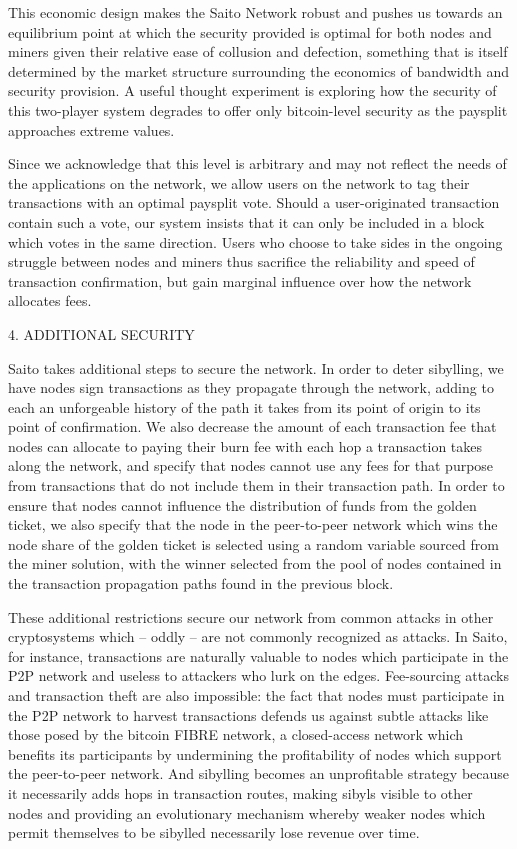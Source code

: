 \documentclass[12pt, oneside]{article}   	%
\begin{document}
\begin{multicols}{2}
This economic design makes the Saito Network robust and pushes us towards an equilibrium point at which the security provided is optimal for both nodes and miners given their relative ease of collusion and defection, something that is itself determined by the market structure surrounding the economics of bandwidth and security provision. A useful thought experiment is exploring how the security of this two-player system degrades to offer only bitcoin-level security as the paysplit approaches extreme values.

Since we acknowledge that this level is arbitrary and may not reflect the needs of the applications on the network, we allow users on the network to tag their transactions with an optimal paysplit vote. Should a user-originated transaction contain such a vote, our system insists that it can only be included in a block which votes in the same direction. Users who choose to take sides in the ongoing struggle between nodes and miners thus sacrifice the reliability and speed of transaction confirmation, but gain marginal influence over how the network allocates fees.

4. ADDITIONAL SECURITY

Saito takes additional steps to secure the network. In order to deter sibylling, we have nodes sign transactions as they propagate through the network, adding to each an unforgeable history of the path it takes from its point of origin to its point of confirmation. We also decrease the amount of each transaction fee that nodes can allocate to paying their burn fee with each hop a transaction takes along the network, and specify that nodes cannot use any fees for that purpose from transactions that do not include them in their transaction path. In order to ensure that nodes cannot influence the distribution of funds from the golden ticket, we also specify that the node in the peer-to-peer network which wins the node share of the golden ticket is selected using a random variable sourced from the miner solution, with the winner selected from the pool of nodes contained in the transaction propagation paths found in the previous block.

These additional restrictions secure our network from common attacks in other cryptosystems which -- oddly -- are not commonly recognized as attacks. In Saito, for instance, transactions are naturally valuable to nodes which participate in the P2P network and useless to attackers who lurk on the edges. Fee-sourcing attacks and transaction theft are also impossible: the fact that nodes must participate in the P2P network to harvest transactions defends us against subtle attacks like those posed by the bitcoin FIBRE network, a closed-access network which benefits its participants by undermining the profitability of nodes which support the peer-to-peer network. And sibylling becomes an unprofitable strategy because it necessarily adds hops in transaction routes, making sibyls visible to other nodes and providing an evolutionary mechanism whereby weaker nodes which permit themselves to be sibylled necessarily lose revenue over time. 


\end{multicols}
\end{document}
